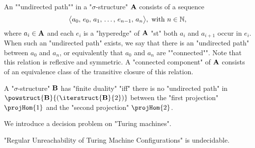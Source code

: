 An \AP""undirected path"" in a "$\sigma$-structure" $\mathbf{A}$ consists of a sequence
\[\big\langle a_0,\, e_0,\, a_1,\, \hdots,\, e_{n-1},\, a_n\big\rangle, \text{ with } n \in \mathbb{N},\]
where $a_i \in \mathbf{A}$ and each $e_i$ is a "hyperedge" of $\mathbf{A}$ "st" both
$a_i$ and $a_{i+1}$ occur in $e_i$. When such an "undirected path" exists, we say that
there is an "undirected path" between $a_0$ and $a_n$, or equivalently
that $a_0$ and $a_n$ are \AP""connected"". Note that this relation is reflexive
and symmetric.
A \AP"connected component" of $\mathbf{A}$ consists of an equivalence class of the transitive closure
of this relation.

\begin{lemma}
  A "$\sigma$-structure" $\mathbf{B}$ has "finite duality" "iff" there is no "undirected path"
  in $\powstruct{\?B}{(\iterstruct{\?B}{2})}$ between the "first projection"
  $\projHom{1}$ and the "second projection" $\projHom{2}$.
\end{lemma}

We introduce a decision problem on "Turing machines".

\begin{lemma}
  "Regular Unreachability of Turing Machine Configurations" is undecidable.
\end{lemma}

